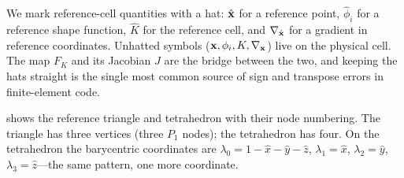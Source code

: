 \begin{notationbox}
We mark reference-cell quantities with a hat: $\hat{\mathbf{x}}$ for a reference point,
$\hat\phi_i$ for a reference shape function, $\hat K$ for the reference cell, and
$\nabla_{\hat{\mathbf{x}}}$ for a gradient in reference coordinates. Unhatted symbols
($\mathbf{x},\phi_i,K,\nabla_{\mathbf{x}}$) live on the physical cell. The map $F_K$ and its Jacobian
$J$ are the bridge between the two, and keeping the hats straight is the single most
common source of sign and transpose errors in finite-element code.
\end{notationbox}

 shows the reference triangle and tetrahedron with their node
numbering. The triangle has three vertices (three $P_1$ nodes); the tetrahedron has
four. On the tetrahedron the barycentric coordinates are
$\lambda_0=1-\hat x-\hat y-\hat z$, $\lambda_1=\hat x$, $\lambda_2=\hat y$,
$\lambda_3=\hat z$---the same pattern, one more coordinate.

